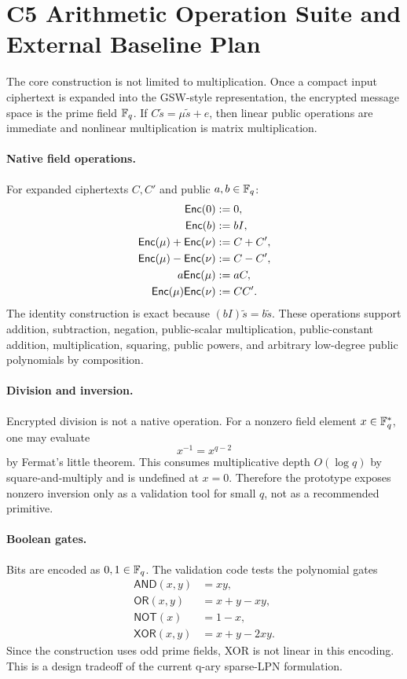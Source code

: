 \section{C5 Arithmetic Operation Suite and External Baseline Plan}
\label{app:c5-arithmetic}

The core construction is not limited to multiplication.  Once a compact input ciphertext is expanded into the GSW-style representation, the encrypted message space is the prime field $\mathbb{F}_q$.  If $C\tilde{s}=\mu\tilde{s}+e$, then linear public operations are immediate and nonlinear multiplication is matrix multiplication.

\paragraph{Native field operations.}
For expanded ciphertexts $C,C'$ and public $a,b\in\mathbb{F}_q$:
\begin{align*}
\mathsf{Enc}(0) &:= 0,\\
\mathsf{Enc}(b) &:= bI,\\
\mathsf{Enc}(\mu)+\mathsf{Enc}(\nu) &:= C+C',\\
\mathsf{Enc}(\mu)-\mathsf{Enc}(\nu) &:= C-C',\\
 a\mathsf{Enc}(\mu) &:= aC,\\
\mathsf{Enc}(\mu)\mathsf{Enc}(\nu) &:= CC'.
\end{align*}
The identity construction is exact because $(bI)\tilde{s}=b\tilde{s}$.  These operations support addition, subtraction, negation, public-scalar multiplication, public-constant addition, multiplication, squaring, public powers, and arbitrary low-degree public polynomials by composition.

\paragraph{Division and inversion.}
Encrypted division is not a native operation.  For a nonzero field element $x\in\mathbb{F}_q^*$, one may evaluate
\[
  x^{-1}=x^{q-2}
\]
by Fermat's little theorem.  This consumes multiplicative depth $O(\log q)$ by square-and-multiply and is undefined at $x=0$.  Therefore the prototype exposes nonzero inversion only as a validation tool for small $q$, not as a recommended primitive.

\paragraph{Boolean gates.}
Bits are encoded as $0,1\in\mathbb{F}_q$.  The validation code tests the polynomial gates
\begin{align*}
\mathsf{AND}(x,y)&=xy,\\
\mathsf{OR}(x,y)&=x+y-xy,\\
\mathsf{NOT}(x)&=1-x,\\
\mathsf{XOR}(x,y)&=x+y-2xy.
\end{align*}
Since the construction uses odd prime fields, XOR is not linear in this encoding.  This is a design tradeoff of the current q-ary sparse-LPN formulation.

